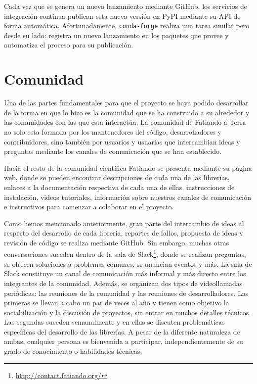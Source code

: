 Cada vez que se genera un nuevo lanzamiento mediante GitHub,
los servicios de integración continua publican esta nueva versión en PyPI
mediante su \ac{API} de forma automática.
Afortunadamente, \texttt{conda-forge} realiza una tarea similar pero desde su
lado: registra un nuevo lanzamiento en los paquetes que provee y automatiza el
proceso para su publicación.


\section{Comunidad}
\label{sec:fatiando-community}

Una de las partes fundamentales para que el proyecto se haya podido desarrollar
de la forma en que lo hizo es la comunidad que se ha construido a su alrededor
y las comunidades con las que ésta interactúa.
La comunidad de Fatiando a Terra no solo esta formada por los mantenedores del
código, desarrolladores y contribuidores, sino también por usuarios
y usuarias que intercambian ideas y preguntas mediante los canales de
comunicación que se han establecido.

Hacia el resto de la comunidad científica Fatiando se presenta mediante su
página web, donde se pueden encontrar descripciones de cada una de las
librerías, enlaces a la documentación respectiva de cada una de ellas,
instrucciones de instalación, videos tutoriales, información sobre nuestros
canales de comunicación e instructivos para comenzar a colaborar en el
proyecto.

Como hemos mencionado anteriormente, gran parte del intercambio de ideas al
respecto del desarrollo de cada librería, reportes de fallos, propuesta de
ideas y revisión de código se realiza mediante GitHub.
Sin embargo, muchas otras conversaciones suceden dentro de la sala de
Slack\footnote{\url{http://contact.fatiando.org/}}, donde se realizan
preguntas, se ofrecen soluciones a problemas comunes, se anuncian eventos
y más.
La sala de Slack constituye un canal de comunicación más informal y más
directo entre los integrantes de la comunidad.
Además, se organizan dos tipos de videollamadas periódicas: las reuniones de la
comunidad y las reuniones de desarrolladores.
Las primeras se llevan a cabo un par de veces al año y tienen como objetivo la
sociabilización y la discusión de proyectos, sin entrar en muchos detalles
técnicos.
Las segundas suceden semanalmente y en ellas se discuten problemáticas
específicas del desarrollo de las librerías.
A pesar de la diferente naturaleza de ambas, cualquier persona es bienvenida
a participar, independientemente de su grado de conocimiento o habilidades
técnicas.

